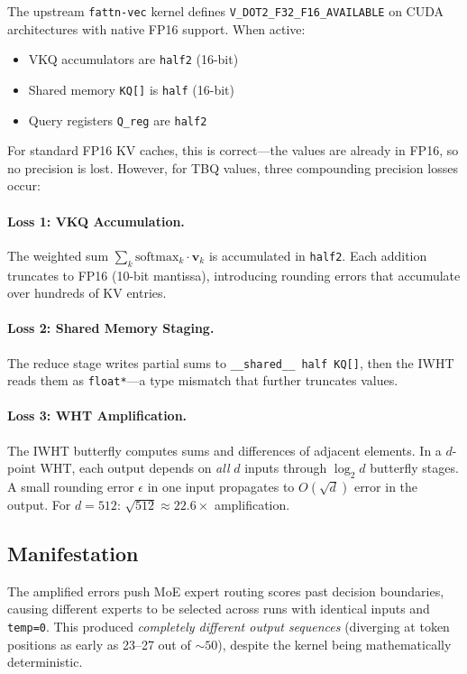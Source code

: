 \documentclass[10pt,twocolumn]{article}
\begin{document}
The upstream \texttt{fattn-vec} kernel defines \texttt{V\_DOT2\_F32\_F16\_AVAILABLE} on CUDA architectures with native FP16 support. When active:
\begin{itemize}[leftmargin=*,topsep=2pt,itemsep=1pt]
\item VKQ accumulators are \texttt{half2} (16-bit)
\item Shared memory \texttt{KQ[]} is \texttt{half} (16-bit)
\item Query registers \texttt{Q\_reg} are \texttt{half2}
\end{itemize}

For standard FP16 KV caches, this is correct---the values are already in FP16, so no precision is lost. However, for TBQ values, three compounding precision losses occur:

\paragraph{Loss 1: VKQ Accumulation.} The weighted sum $\sum_k \text{softmax}_k \cdot \mathbf{v}_k$ is accumulated in \texttt{half2}. Each addition truncates to FP16 (10-bit mantissa), introducing rounding errors that accumulate over hundreds of KV entries.

\paragraph{Loss 2: Shared Memory Staging.} The reduce stage writes partial sums to \texttt{\_\_shared\_\_ half KQ[]}, then the IWHT reads them as \texttt{float*}---a type mismatch that further truncates values.

\paragraph{Loss 3: WHT Amplification.} The IWHT butterfly computes sums and differences of adjacent elements. In a $d$-point WHT, each output depends on \emph{all} $d$ inputs through $\log_2 d$ butterfly stages. A small rounding error $\epsilon$ in one input propagates to $O(\sqrt{d})$ error in the output. For $d=512$: $\sqrt{512} \approx 22.6\times$ amplification.

\subsection{Manifestation}

The amplified errors push MoE expert routing scores past decision boundaries, causing different experts to be selected across runs with identical inputs and \texttt{temp=0}. This produced \emph{completely different output sequences} (diverging at token positions as early as 23--27 out of ${\sim}50$), despite the kernel being mathematically deterministic.
\end{document}
